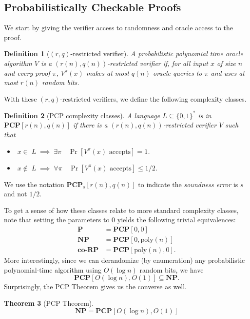 \documentclass{article}
\newtheorem{theorem}{Theorem}
\newtheorem{definition}[theorem]{Definition}
\newcommand{\poly}{{\mathrm{poly}}}
\newcommand{\bits}{\{0,1\}}
\newcommand{\class}[1]{\mathbf{#1}}
\newcommand{\coclass}[1]{\mathbf{co\mbox{-}#1}} %
\newcommand{\NP}{\class{NP}}
\newcommand{\PCP}{\class{PCP}}
\newcommand{\coRP}{\coclass{RP}}
\renewcommand{\P}{\class{P}}
\begin{document}
%
%
%
%
%
%


\subsection{Probabilistically Checkable Proofs}

We start by giving the verifier access to randomness and oracle access to the
proof.

\begin{definition}[$(r, q)$-restricted verifier]
A probabilistic polynomial time oracle algorithm $V$ is a \emph{$(r(n), q(n))$-restricted verifier} if,
for all input $x$ of size $n$ and every proof $\pi$, $V^\pi(x)$ makes at most $q(n)$ oracle queries
to $\pi$ and uses at most $r(n)$ random bits.
\end{definition}

With these $(r, q)$-restricted verifiers, we define the following complexity classes.

\begin{definition}[PCP complexity classes]
A language $L\subseteq\bits^*$ is in $\PCP[r(n), q(n)]$ if there is a
$(r(n), q(n))$-restricted verifier $V$ such that
\begin{itemize}[leftmargin=10em]
\item[\textbf{(Completeness)}] $\;x \in\; L \;\implies\; \exists \pi \quad \Pr[V^\pi(x) \text{ accepts}] = 1$.
\item[\textbf{(Soundness)}] $\;x \notin\; L \;\implies\; \forall \pi \quad \Pr[V^\pi(x) \text{ accepts}] \le 1/2$.
\end{itemize}
\end{definition}
We use the notation $\PCP_s[r(n), q(n)]$ to indicate the \emph{soundness error} is $s$ and not $1/2$.

To get a sense of how these classes relate to more standard complexity classes,
note that setting the parameters to $0$ yields the following trivial equivalences:
\begin{align*}
\P &= \PCP[0, 0] \\
\NP &= \PCP[0, \poly(n)] \\
\coRP &= \PCP[\poly(n), 0].
\end{align*}
More interestingly, since we can derandomize (by enumeration) any probabilistic polynomial-time algorithm
using $O(\log n)$ random bits, we have
$$
\PCP[O(\log n), O(1)] \subseteq \NP.
$$
Surprisingly, the PCP Theorem gives us the converse as well.

\begin{theorem}[PCP Theorem]\label{pcp}
$$
\NP = \PCP[O(\log n), O(1)]
$$
\end{theorem}
\end{document}
